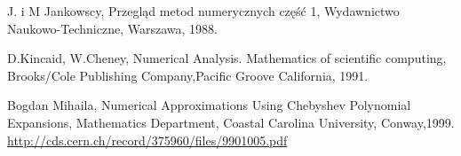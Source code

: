 \documentclass[12pt,wide]{mwart}
\begin{document}


\begin{thebibliography}{9}
\itemsep2pt
 J. i M Jankowscy, Przegląd metod numerycznych część 1,
             Wydawnictwo Naukowo-Techniczne, Warszawa, 1988.
             
						
 D.Kincaid, W.Cheney, Numerical Analysis. Mathematics of scientific computing, Brooks/Cole Publishing Company,Pacific Groove California, 1991.

 Bogdan Mihaila, Numerical Approximations Using Chebyshev Polynomial Expansions, Mathematics Department, Coastal Carolina University, Conway,1999. \url{http://cds.cern.ch/record/375960/files/9901005.pdf}
							

							
\end{thebibliography}
\end{document}
